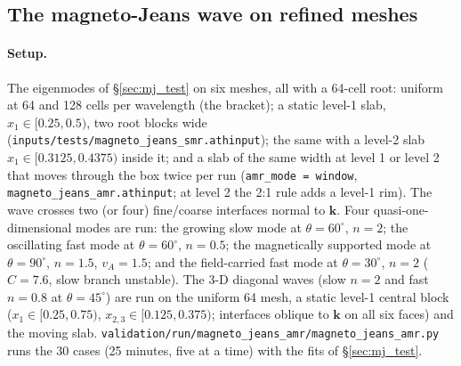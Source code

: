 \documentclass[11pt]{article}
\newcommand{\code}[1]{\texttt{#1}}
\newcommand{\file}[1]{\texttt{#1}}
\begin{document}
\subsection{The magneto-Jeans wave on refined meshes}
\label{sec:mj_amr}

\paragraph{Setup.} The eigenmodes of \S\ref{sec:mj_test} on six meshes, all with a
64-cell root: uniform at 64 and 128 cells per wavelength (the bracket); a static level-1
slab, $x_1\in[0.25, 0.5)$, two root blocks wide (\file{inputs/tests/magneto\_jeans\_smr.athinput});
the same with a level-2 slab $x_1\in[0.3125, 0.4375)$ inside it; and a slab of the same
width at level 1 or level 2 that moves through the box twice per run
(\code{amr\_mode = window}, \file{magneto\_jeans\_amr.athinput}; at level 2 the 2:1 rule adds
a level-1 rim). The wave crosses two (or four) fine/coarse interfaces normal to
$\mathbf k$. Four quasi-one-dimensional modes are run: the growing slow mode at
$\theta = 60^\circ$, $n = 2$; the oscillating fast mode at $\theta = 60^\circ$, $n = 0.5$; the
magnetically supported mode at $\theta = 90^\circ$, $n = 1.5$, $v_A = 1.5$; and the
field-carried fast mode at $\theta = 30^\circ$, $n = 2$ ($C = 7.6$, slow branch unstable).
The 3-D diagonal waves (slow $n = 2$ and fast $n = 0.8$ at $\theta = 45^\circ$) are run on
the uniform 64 mesh, a static level-1 central block ($x_1\in[0.25, 0.75)$,
$x_{2,3}\in[0.125, 0.375)$; interfaces oblique to $\mathbf k$ on all six faces) and the
moving slab. \file{validation/run/magneto\_jeans\_amr/magneto\_jeans\_amr.py} runs the 30
cases (25 minutes, five at a time) with the fits of \S\ref{sec:mj_test}.
\end{document}

